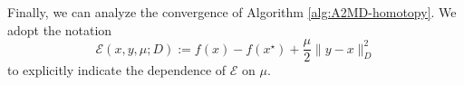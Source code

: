 \documentclass{article}
\theoremstyle{plain}
\newtheorem{theorem}{Theorem}
\theoremstyle{remark}
\begin{document}


Finally, we can analyze the convergence of Algorithm \ref{alg:A2MD-homotopy}. We adopt the notation $$\mathcal{E}(x,y,\mu;D):=f(x)-f(x^\star)+\frac{\mu}{2}\|y-x\|_D^2$$ to explicitly indicate the dependence of $\mathcal{E}$ on $\mu$.

\end{document}
